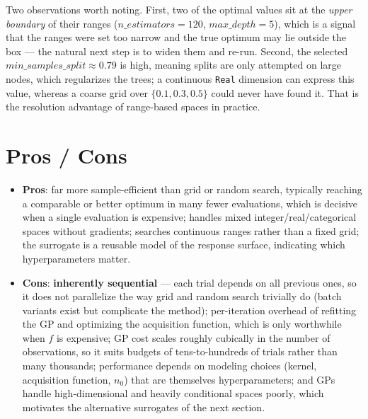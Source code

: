 \documentclass[conference]{IEEEtran}
\begin{document}
Two observations worth noting. First, two of the optimal values sit at the \textit{upper boundary} of their ranges ($n\_estimators=120$, $max\_depth=5$), which is a signal that the ranges were set too narrow and the true optimum may lie outside the box --- the natural next step is to widen them and re-run. Second, the selected $min\_samples\_split \approx 0.79$ is high, meaning splits are only attempted on large nodes, which regularizes the trees; a continuous \texttt{Real} dimension can express this value, whereas a coarse grid over $\{0.1, 0.3, 0.5\}$ could never have found it. That is the resolution advantage of range-based spaces in practice.

\section*{Pros / Cons}
\begin{itemize}
    \item \textbf{Pros}: far more sample-efficient than grid or random search, typically reaching a comparable or better optimum in many fewer evaluations, which is decisive when a single evaluation is expensive; handles mixed integer/real/categorical spaces without gradients; searches continuous ranges rather than a fixed grid; the surrogate is a reusable model of the response surface, indicating which hyperparameters matter.
    \item \textbf{Cons}: \textbf{inherently sequential} --- each trial depends on all previous ones, so it does not parallelize the way grid and random search trivially do (batch variants exist but complicate the method); per-iteration overhead of refitting the GP and optimizing the acquisition function, which is only worthwhile when $f$ is expensive; GP cost scales roughly cubically in the number of observations, so it suits budgets of tens-to-hundreds of trials rather than many thousands; performance depends on modeling choices (kernel, acquisition function, $n_0$) that are themselves hyperparameters; and GPs handle high-dimensional and heavily conditional spaces poorly, which motivates the alternative surrogates of the next section.
\end{itemize}
\end{document}

